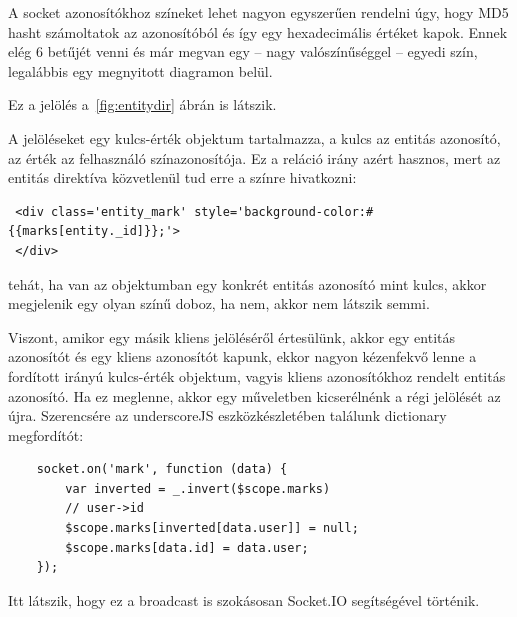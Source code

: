 A socket azonosítókhoz színeket lehet nagyon egyszerűen rendelni úgy, hogy MD5 hasht számoltatok az azonosítóból és így egy hexadecimális értéket kapok. Ennek elég 6 betűjét venni és már megvan egy -- nagy valószínűséggel -- egyedi szín, legalábbis egy megnyitott diagramon belül.

Ez a jelölés a~\ref{fig:entitydir} ábrán is látszik. 

A jelöléseket egy kulcs-érték objektum tartalmazza, a kulcs az entitás azonosító, az érték az felhasználó színazonosítója. Ez a reláció irány azért hasznos, mert az entitás direktíva közvetlenül tud erre a színre hivatkozni:

\begin{lstlisting}
 <div class='entity_mark' style='background-color:#{{marks[entity._id]}};'>
 </div>
\end{lstlisting} 

tehát, ha van az objektumban egy konkrét entitás azonosító mint kulcs, akkor megjelenik egy olyan színű doboz, ha nem, akkor nem látszik semmi. 

Viszont, amikor egy másik kliens jelöléséről értesülünk, akkor egy entitás azonosítót és egy kliens azonosítót kapunk, ekkor nagyon kézenfekvő lenne a fordított irányú kulcs-érték objektum, vagyis kliens azonosítókhoz rendelt entitás azonosító. Ha ez meglenne, akkor egy műveletben kicserélnénk a régi jelölését az újra. Szerencsére az underscoreJS eszközkészletében találunk dictionary megfordítót:

\begin{lstlisting}
    socket.on('mark', function (data) {
        var inverted = _.invert($scope.marks)
        // user->id
        $scope.marks[inverted[data.user]] = null;
        $scope.marks[data.id] = data.user;
    });
\end{lstlisting}

Itt látszik, hogy ez a broadcast is szokásosan Socket.IO segítségével történik.